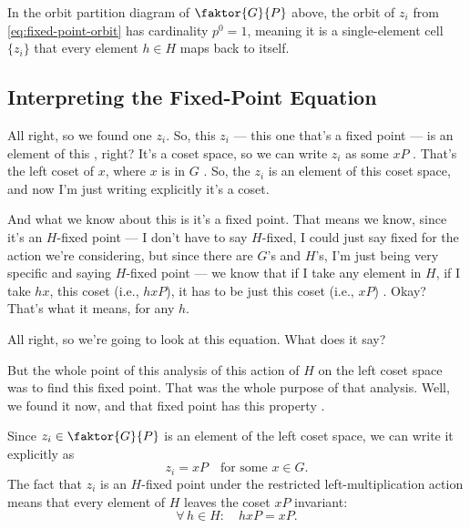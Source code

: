 \begin{proofWrapper}
\begin{content}
\begin{steps}
In the orbit partition diagram of $\faktor{G}{P}$ above, the orbit of $z_i$ from \eqref{eq:fixed-point-orbit} has cardinality $p^0 = 1$, meaning it is a single-element cell $\{z_i\}$ that every element $h \in H$ maps back to itself.
\end{steps}
\end{content}

\subsection{Interpreting the Fixed-Point Equation}

\begin{speech}[00:27:50 - 00:29:14]
All right, so we found one $z_i$. So, this $z_i$ --- this one that's a fixed point --- is an element of this , right? It's a coset space, so we can write $z_i$ as some $x P$ . That's the left coset of $x$, where $x$ is in $G$ . So, the $z_i$ is an element of this coset space, and now I'm just writing explicitly it's a coset.

And what we know about this is it's a fixed point. That means we know, since it's an $H$-fixed point --- I don't have to say $H$-fixed, I could just say fixed for the action we're considering, but since there are $G$'s and $H$'s, I'm just being very specific and saying $H$-fixed point --- we know that if I take any element in $H$, if I take $h x$, this coset (i.e., $h x P$), it has to be just this coset (i.e., $x P$) . Okay? That's what it means, for any $h$.

All right, so we're going to look at this equation. What does it say?

But the whole point of this analysis of this action of $H$ on the left coset space was to find this fixed point. That was the whole purpose of that analysis. Well, we found it now, and that fixed point has this property .
\end{speech}

\begin{content}
Since $z_i \in \faktor{G}{P}$ is an element of the left coset space, we can write it explicitly as
\[
z_i = x P \quad \text{for some } x \in G.
\]
The fact that $z_i$ is an $H$-fixed point under the restricted left-multiplication action means that every element of $H$ leaves the coset $x P$ invariant:
\begin{equation}\label{eq:fixed-point-coset}
\forall\, h \in H \colon \quad h x P = x P.
\end{equation}
\end{content}


\end{proofWrapper}
